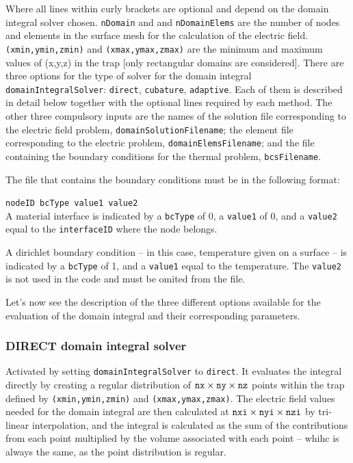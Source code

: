 \documentclass[12pt]{article}
\begin{document}
Where all lines within curly brackets are optional and depend on the domain integral solver chosen. \verb+nDomain+ and and \verb+nDomainElems+ are the number of nodes and elements in the surface mesh for the calculation of the electric field. \verb+(xmin,ymin,zmin)+ and \verb+(xmax,ymax,zmax)+ are the minimum and maximum values of (x,y,z) in the trap [only rectangular domains are considered]. There are three options for the type of solver for the domain integral \verb+domainIntegralSolver+: \verb+direct+, \verb+cubature+, \verb+adaptive+. Each of them is described in detail below together with the optional lines required by each method. The other three compulsory inputs are the names of the solution file corresponding to the electric field problem, \verb+domainSolutionFilename+; the element file corresponding to the electric problem, \verb+domainElemsFilename+; and the file containing the boundary conditions for the thermal problem, \verb+bcsFilename+.

The file that contains the boundary conditions must be in the following format:

\texttt{nodeID bcType value1 value2}\\

A material interface is indicated by a \verb+bcType+ of 0, a \verb+value1+ of 0, and a \verb+value2+ equal to the \verb+interfaceID+ where the node belongs.

A dirichlet boundary condition -- in this case, temperature given on a surface -- is indicated by a \verb+bcType+ of 1, and a \verb+value1+ equal to the temperature. The \verb+value2+ is not used in the code and must be omited from the file.

Let's now see the description of the three different options available for the evaluation of the domain integral and their corresponding parameters.

\subsubsection{DIRECT domain integral solver}
Activated by setting \verb+domainIntegralSolver+ to \verb+direct+. It evaluates the integral directly by creating a regular distribution of ${\tt nx}\times{\tt ny}\times{\tt nz}$ points within the trap defined by \verb+(xmin,ymin,zmin)+ and \verb+(xmax,ymax,zmax)+. The electric field values needed for the domain integral are then calculated at ${\tt nxi}\times{\tt nyi}\times{\tt nzi}$ by tri-linear interpolation, and the integral is  calculated as the sum of the contributions from each point multiplied by the volume associated with each point -- whihc is always the same, as the point distribution is regular.
\end{document}
